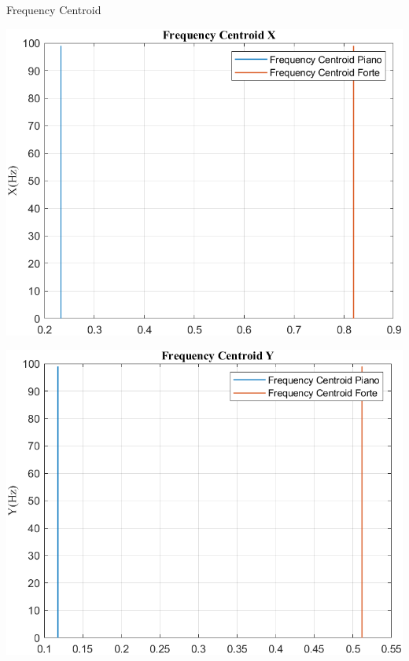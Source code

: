 \documentclass[beamer]{standalone}
\begin{document}
	\begin{frame}{{Frequency Centroid}}
		\begin{minipage}{.45\textwidth}
			\centering\includegraphics[width=.9\textwidth]{figure/Acc/Trasformata/Frequency CentroidX}
		\end{minipage}
		\hspace{.05\textwidth}
		\begin{minipage}{.45\textwidth}
			\centering\includegraphics[width=.9\textwidth]{figure/Acc/Trasformata/Frequency CentroidY}
		\end{minipage}
	\end{frame}
	
\end{document}
